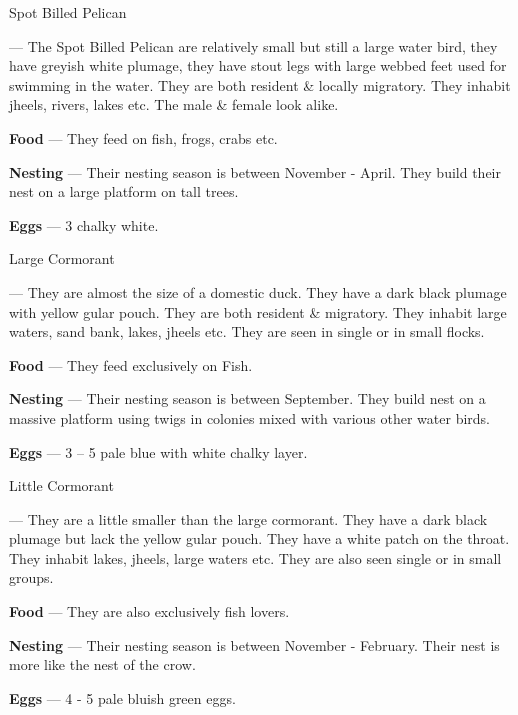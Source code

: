 \begin{bird}{Spot Billed Pelican}

 --- The Spot Billed Pelican are relatively small but still a large water bird, they have greyish white plumage, they have  stout legs with large webbed feet used for swimming in the water. They are both resident \& locally migratory. They inhabit jheels, rivers, lakes etc. The male \& female look alike. 

{\large\bf Food} --- They feed on fish, frogs, crabs etc.

{\large\bf Nesting} --- Their nesting season is between November - April. They build their nest on a large platform on tall trees.

{\large\bf Eggs} --- 3 chalky white.
\end{bird}

\newpage

\begin{bird}{Large Cormorant}

 --- They are almost the size of a domestic duck. They have a dark black plumage with yellow gular pouch. They are both resident \& migratory. They inhabit large waters, sand bank, lakes, jheels etc. They are seen in single or in small flocks.

{\large\bf Food} --- They feed exclusively on Fish.

{\large\bf Nesting} --- Their nesting season is between September. They build nest on a massive platform using twigs in colonies mixed with various other water birds. 

{\large\bf Eggs} --- 3 -- 5 pale blue with white chalky layer. 
\end{bird}

\begin{bird}{Little Cormorant}

 --- They are a little smaller than the large cormorant. They have a dark black plumage but lack the yellow gular pouch. They have a white patch on the throat. They inhabit lakes, jheels, large waters etc. They are also seen single or in small groups. 

{\large\bf Food} --- They are also exclusively fish lovers.

{\large\bf Nesting} --- Their nesting season is between November - February. Their nest is more like the nest of the crow. 

{\large\bf Eggs} --- 4 - 5 pale bluish green eggs.
\end{bird}

